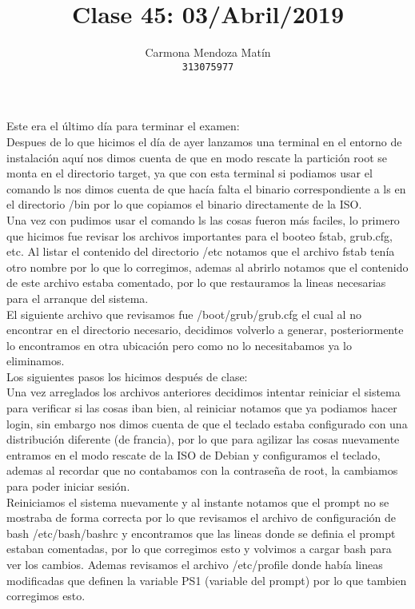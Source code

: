 \documentclass[11pt, a4paper]{report}
\begin{document}
\title{Clase 45: 03/Abril/2019}
\author{
  Carmona Mendoza Mat\'in\\
  \texttt{313075977}
}
\date{}
\maketitle

Este era el último día para terminar el examen: \\

Despues de lo que hicimos el día de ayer lanzamos una terminal en el entorno de instalación aquí nos dimos cuenta de que en modo rescate la partición root se
monta en el directorio target, ya que con esta terminal si podiamos usar el
comando ls nos dimos cuenta de que hacía falta el binario correspondiente a ls
en el directorio /bin por lo que copiamos el binario directamente de la ISO. \\

Una vez con pudimos usar el comando ls las cosas fueron más faciles, lo
primero que hicimos fue revisar los archivos importantes para el booteo
fstab, grub.cfg, etc. Al listar el contenido del directorio /etc
notamos que el archivo fstab tenía otro nombre por lo que lo corregimos,
ademas al abrirlo notamos que el contenido de este archivo estaba
comentado, por lo que restauramos la lineas necesarias para el arranque
del sistema. \\

El siguiente archivo que revisamos fue /boot/grub/grub.cfg el cual al
no encontrar en el directorio necesario, decidimos volverlo a generar,
posteriormente lo encontramos en otra ubicación pero como no lo necesitabamos ya
lo eliminamos. \\

Los siguientes pasos los hicimos después de clase: \\

Una vez arreglados los archivos anteriores decidimos intentar reiniciar
el sistema para verificar si las cosas iban bien, al reiniciar notamos
que ya podiamos hacer login, sin embargo nos dimos cuenta de que el
teclado estaba configurado con una distribución diferente (de francia), por
lo que para agilizar las cosas nuevamente entramos en el modo rescate de la
ISO de Debian y configuramos el teclado, ademas al recordar que no
contabamos con la contraseña de root, la cambiamos para poder iniciar
sesión. \\

Reiniciamos el sistema nuevamente y al instante notamos que el prompt
no se mostraba de forma correcta por lo que revisamos el archivo de
configuración de bash /etc/bash/bashrc y encontramos que las lineas
donde se definia el prompt estaban comentadas, por lo que corregimos esto
y volvimos a cargar bash para ver los cambios. Ademas revisamos el archivo
/etc/profile donde había lineas modificadas que definen la variable PS1
(variable del prompt) por lo que tambien corregimos esto. \\
\end{document}
